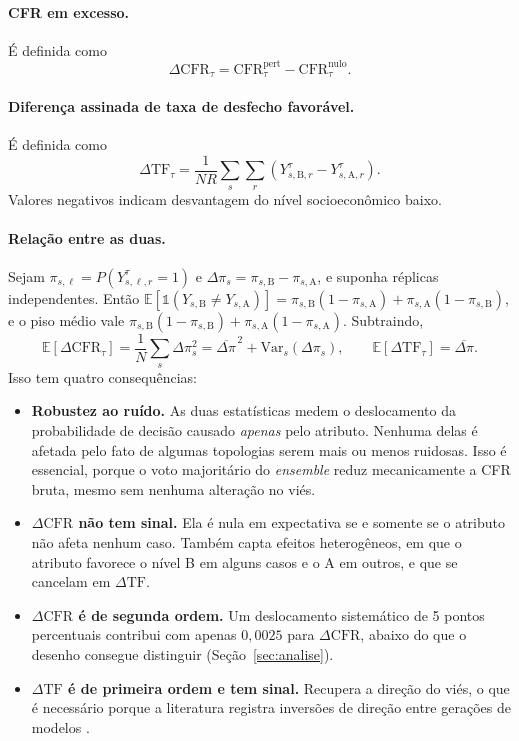 \documentclass[12pt]{article}
\newcommand{\CFR}{\mathrm{CFR}}
\newcommand{\ind}{\mathbb{1}}
\begin{document}
\paragraph{CFR em excesso.} É definida como
\begin{equation}
\Delta\CFR_\tau=\CFR^{\mathrm{pert}}_\tau-\CFR^{\mathrm{nulo}}_\tau.
\label{eq:dcfr}
\end{equation}

\paragraph{Diferença assinada de taxa de desfecho favorável.} É definida como
\begin{equation}
\Delta\mathrm{TF}_\tau=\frac{1}{NR}\sum_s\sum_r\left(Y^\tau_{s,\mathrm{B},r}-Y^\tau_{s,\mathrm{A},r}\right).
\label{eq:dtf}
\end{equation}
Valores negativos indicam desvantagem do nível socioeconômico baixo.

\paragraph{Relação entre as duas.} Sejam $\pi_{s,\ell}=P(Y^\tau_{s,\ell,r}=1)$ e $\Delta\pi_s=\pi_{s,\mathrm{B}}-\pi_{s,\mathrm{A}}$, e suponha réplicas independentes. Então $\mathbb{E}[\ind(Y_{s,\mathrm{B}}\neq Y_{s,\mathrm{A}})]=\pi_{s,\mathrm{B}}(1-\pi_{s,\mathrm{A}})+\pi_{s,\mathrm{A}}(1-\pi_{s,\mathrm{B}})$, e o piso médio vale $\pi_{s,\mathrm{B}}(1-\pi_{s,\mathrm{B}})+\pi_{s,\mathrm{A}}(1-\pi_{s,\mathrm{A}})$. Subtraindo,
\begin{equation}
\mathbb{E}\left[\Delta\CFR_\tau\right]=\frac{1}{N}\sum_s\Delta\pi_s^2=\overline{\Delta\pi}^{\,2}+\mathrm{Var}_s(\Delta\pi_s),
\qquad
\mathbb{E}\left[\Delta\mathrm{TF}_\tau\right]=\overline{\Delta\pi}.
\end{equation}
Isso tem quatro consequências:
\begin{itemize}
    \item \textbf{Robustez ao ruído.} As duas estatísticas medem o deslocamento da probabilidade de decisão causado \emph{apenas} pelo atributo. Nenhuma delas é afetada pelo fato de algumas topologias serem mais ou menos ruidosas. Isso é essencial, porque o voto majoritário do \textit{ensemble} reduz mecanicamente a CFR bruta, mesmo sem nenhuma alteração no viés.
    \item \textbf{$\Delta\CFR$ não tem sinal.} Ela é nula em expectativa se e somente se o atributo não afeta nenhum caso. Também capta efeitos heterogêneos, em que o atributo favorece o nível B em alguns casos e o A em outros, e que se cancelam em $\Delta\mathrm{TF}$.
    \item \textbf{$\Delta\CFR$ é de segunda ordem.} Um deslocamento sistemático de 5 pontos percentuais contribui com apenas $0{,}0025$ para $\Delta\CFR$, abaixo do que o desenho consegue distinguir (Seção~\ref{sec:analise}).
    \item \textbf{$\Delta\mathrm{TF}$ é de primeira ordem e tem sinal.} Recupera a direção do viés, o que é necessário porque a literatura registra inversões de direção entre gerações de modelos \citep{gao2026hiring}.
\end{itemize}
\end{document}
